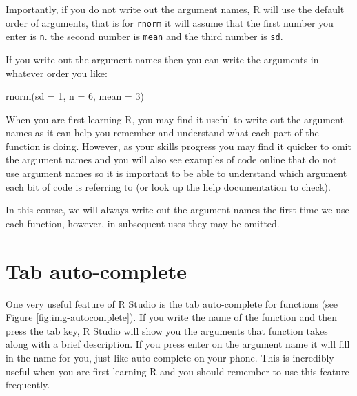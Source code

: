 \documentclass[
  oneside]{book}
\newenvironment{Shaded}{\begin{snugshade}}{\end{snugshade}}
\newcommand{\AttributeTok}[1]{\textcolor[rgb]{0.77,0.63,0.00}{#1}}
\newcommand{\DecValTok}[1]{\textcolor[rgb]{0.00,0.00,0.81}{#1}}
\newcommand{\FunctionTok}[1]{\textcolor[rgb]{0.00,0.00,0.00}{#1}}
\newcommand{\NormalTok}[1]{#1}
\begin{document}
Importantly, if you do not write out the argument names, R will use the default order of arguments, that is for \texttt{rnorm} it will assume that the first number you enter is \texttt{n}. the second number is \texttt{mean} and the third number is \texttt{sd}.

If you write out the argument names then you can write the arguments in whatever order you like:

\begin{Shaded}
\begin{Highlighting}[]
\FunctionTok{rnorm}\NormalTok{(}\AttributeTok{sd =} \DecValTok{1}\NormalTok{, }\AttributeTok{n =} \DecValTok{6}\NormalTok{, }\AttributeTok{mean =} \DecValTok{3}\NormalTok{)}
\end{Highlighting}
\end{Shaded}

When you are first learning R, you may find it useful to write out the argument names as it can help you remember and understand what each part of the function is doing. However, as your skills progress you may find it quicker to omit the argument names and you will also see examples of code online that do not use argument names so it is important to be able to understand which argument each bit of code is referring to (or look up the help documentation to check).

In this course, we will always write out the argument names the first time we use each function, however, in subsequent uses they may be omitted.

\hypertarget{tab-auto-complete}{%
\section{Tab auto-complete}\label{tab-auto-complete}}

One very useful feature of R Studio is the tab auto-complete for functions (see Figure \ref{fig:img-autocomplete}). If you write the name of the function and then press the tab key, R Studio will show you the arguments that function takes along with a brief description. If you press enter on the argument name it will fill in the name for you, just like auto-complete on your phone. This is incredibly useful when you are first learning R and you should remember to use this feature frequently.
\end{document}
